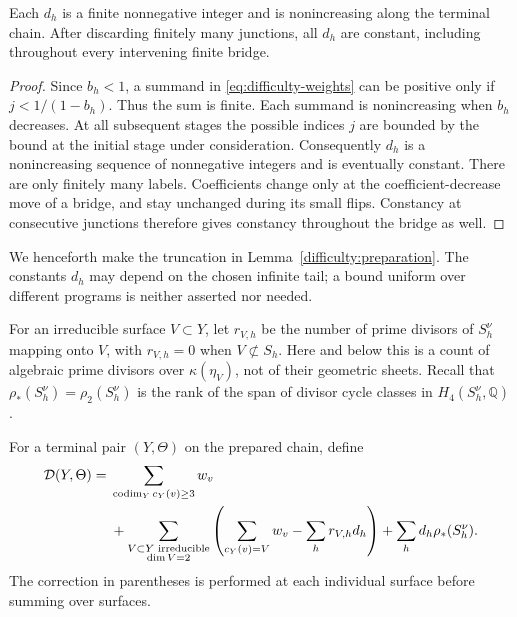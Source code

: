 \begin{lemma}
\label{difficulty:preparation}
Each \(d_h\) is a finite nonnegative integer and is nonincreasing
along the terminal chain.  After discarding finitely many junctions,
all \(d_h\) are constant, including throughout every intervening
finite bridge.
\end{lemma}

\begin{proof}
Since \(b_h<1\), a summand in \eqref{eq:difficulty-weights} can be
positive only if \(j<1/(1-b_h)\).  Thus the sum is finite.  Each
summand is nonincreasing when \(b_h\) decreases.  At all subsequent
stages the possible indices \(j\) are bounded by the bound at the
initial stage under consideration.  Consequently \(d_h\) is a
nonincreasing sequence of nonnegative integers and is eventually
constant.  There are only finitely many labels.  Coefficients change
only at the coefficient-decrease move of a bridge, and stay unchanged
during its small flips.  Constancy at consecutive junctions therefore
gives constancy throughout the bridge as well.
\end{proof}

We henceforth make the truncation in
Lemma~\ref{difficulty:preparation}.  The constants \(d_h\) may depend
on the chosen infinite tail; a bound uniform over different programs
is neither asserted nor needed.

For an irreducible surface \(V\subset Y\), let \(r_{V,h}\) be the
number of prime divisors of \(S_h^\nu\) mapping onto \(V\), with
\(r_{V,h}=0\) when \(V\not\subset S_h\).  Here and below this is a
count of algebraic prime divisors over \(\kappa(\eta_V)\), not of
their geometric sheets.  Recall that
\(\rho_*(S_h^\nu)=\rho_2(S_h^\nu)\) is the rank of the span of
divisor cycle classes in \(H_4(S_h^\nu,\mathbb Q)\).

\begin{definition}
\label{def:difficulty}
For a terminal pair \((Y,\Theta)\) on the prepared chain, define
\begin{align}
\label{eq:difficulty}
 \mathcal D(Y,\Theta)
 ={}&\sum_{\operatorname{codim}_Y c_Y(v)\geq3}w_v
 \\
 &+\sum_{\substack{V\subset Y\text{ irreducible}\\\dim V=2}}
 \left(
       \sum_{c_Y(v)=V}w_v-\sum_h r_{V,h}d_h
 \right)
 +\sum_h d_h\rho_*(S_h^\nu).
 \notag
\end{align}
The correction in parentheses is performed at each individual surface
before summing over surfaces.
\end{definition}

